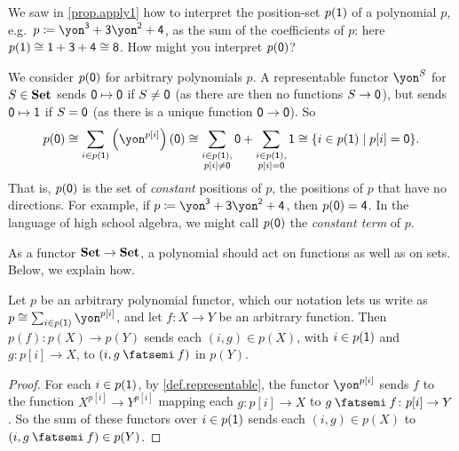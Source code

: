 \documentclass[Book-Poly]{subfiles}
\begin{document}
\begin{exercise}\label{exc.apply0}
    We saw in \cref{prop.apply1} how to interpret the position-set $p(\textsf{1})$ of a polynomial $p$, e.g.\ $p\coloneqq\yon^\3+\3\yon^\2+\4$, as the sum of the coefficients of $p$: here $p(\textsf{1})\cong\textsf{1}+\textsf{3}+\textsf{4}\cong\textsf{8}$.
    How might you interpret $p(\textsf{0})$?
    \begin{solution}
        We consider $p(\textsf{0})$ for arbitrary polynomials $p$.
        A representable functor $\yon^S$ for $S\in\mathbf{Set}$ sends $\textsf{0}\mapsto\textsf{0}$ if $S\neq\textsf{0}$ (as there are then no functions $S\to\textsf{0}$), but sends $\textsf{0}\mapsto\textsf{1}$ if $S=\textsf{0}$ (as there is a unique function $\textsf{0}\to\textsf{0}$).
        So
        \[
        p(\0)\iso\sum_{i\in p(\1)}\left(\yon^{p[i]}\right)(\0)\iso\sum_{\substack{i\in p(\1),\\ p[i]\neq\0}}\0+\sum_{\substack{i\in p(\1),\\ p[i]=\0}}\1\iso\{i\in p(\1)\mid p[i]=\0\}.
        \]
        That is, $p(\textsf{0})$ is the set of \emph{constant} positions of $p$, the positions of $p$ that have no directions.
        For example, if $p\coloneqq\yon^\3+\3\yon^\2+\4$, then $p(\textsf{0})=\textsf{4}$.
        In the language of high school algebra, we might call $p(\textsf{0})$ the \emph{constant term} of $p$.
    \end{solution}
\end{exercise}

As a functor $\mathbf{Set}\to\mathbf{Set}$, a polynomial should act on functions as well as on sets.
Below, we explain how.

\begin{proposition} \label{prop.poly_on_functions}
    Let $p$ be an arbitrary polynomial functor, which our notation lets us write as $p\iso\sum_{i\in p(\1)} \yon^{p[i]}$, and let $f\colon X\to Y$ be an arbitrary function.
    Then $p(f)\colon p(X)\to p(Y)$ sends each $(i, g)\in p(X)$, with $i\in p(\textsf{1})$ and $g\colon p[i]\to X$, to $(i, g\then f)$ in $p(Y)$.
\end{proposition}
\begin{proof}
    For each $i\in p(\textsf{1})$, by \cref{def.representable}, the functor $\yon^{p[i]}$ sends $f$ to the function $X^{p[i]}\to Y^{p[i]}$ mapping each $g\colon p[i]\to X$ to $g\then f\colon p[i]\to Y$.
    So the sum of these functors over $i\in p(\textsf{1})$ sends each $(i, g)\in p(X)$ to $(i, g\then f)\in p(Y)$.
\end{proof}
\end{document}
